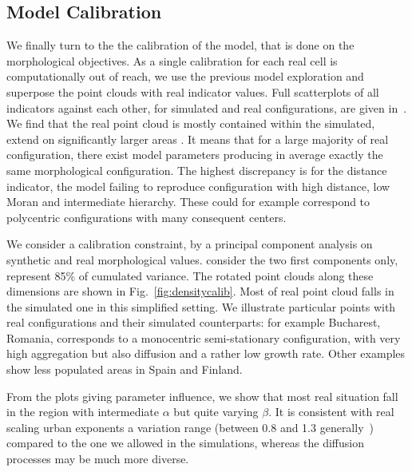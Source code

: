 \documentclass[10pt,letterpaper]{article}
\begin{document}
\subsection*{Model Calibration}


We finally turn to the the calibration of the model, that is done on the morphological  objectives. As a single calibration for each real cell is computationally out of reach, we use the previous model exploration and superpose the point clouds with real indicator values. Full scatterplots of all indicators against each other, for simulated and real configurations, are given in~. We find that the real point cloud is mostly contained within the simulated,  extend on significantly larger areas . It means that for a large majority of real configuration, there exist model parameters producing in average exactly the same morphological configuration. The highest discrepancy is for the distance indicator, the model failing to reproduce configuration with  high  distance,  low Moran and  intermediate hierarchy. These could for example correspond to polycentric configurations with many consequent centers.

We consider a  calibration constraint, by  a principal component analysis on synthetic and real morphological values.  consider the two first components only,  represent 85\% of cumulated variance. The rotated point clouds along these dimensions are shown in Fig.~\ref{fig:densitycalib}. Most of  real point cloud falls in the simulated one in this simplified setting. We illustrate particular points with real configurations and their simulated counterparts: for example Bucharest, Romania, corresponds to a monocentric semi-stationary configuration, with very high aggregation but also diffusion and a rather low growth rate. Other examples show less populated areas in Spain and Finland.

From the plots giving parameter influence, we  show that most  real situation fall in the region with intermediate $\alpha$ but quite varying $\beta$. It is consistent with real scaling urban exponents  a  variation range  (between 0.8 and 1.3 generally~\cite{pumain2006evolutionary}) compared to the one we allowed in the simulations, whereas the diffusion processes may be much more diverse. 
\end{document}

